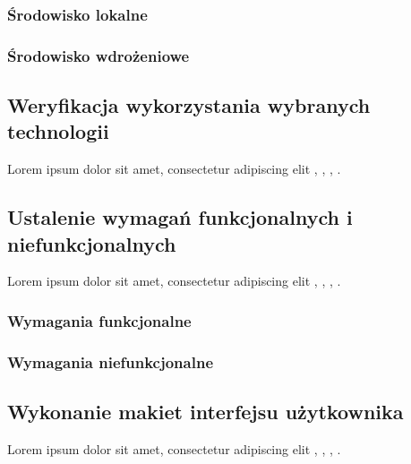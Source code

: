 \subsubsection{Środowisko lokalne}
\kant[2]
\subsubsection{Środowisko wdrożeniowe}
\kant[3]


\subsection{Weryfikacja wykorzystania wybranych technologii}
\kant[9] Lorem ipsum dolor sit amet, consectetur adipiscing elit \cite{benzmuller2014}, \cite{goedel95}, \cite{wang97}, \cite{koons2005}.

\subsection{Ustalenie wymagań funkcjonalnych i niefunkcjonalnych}
\kant[9] Lorem ipsum dolor sit amet, consectetur adipiscing elit \cite{benzmuller2014}, \cite{goedel95}, \cite{wang97}, \cite{koons2005}.
\subsubsection{Wymagania funkcjonalne}
\kant[2]
\subsubsection{Wymagania niefunkcjonalne}
\kant[3]

\subsection{Wykonanie makiet interfejsu użytkownika}
\kant[9] Lorem ipsum dolor sit amet, consectetur adipiscing elit \cite{benzmuller2014}, \cite{goedel95}, \cite{wang97}, \cite{koons2005}.

